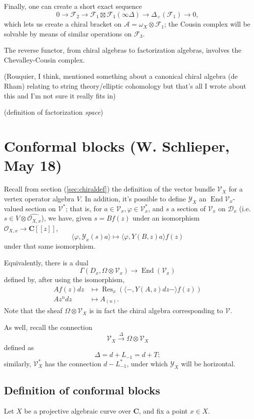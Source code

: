 \documentclass{article}
\newcommand{\CC}{\mathbold{C}}
\newcommand{\Oo}{\mathcal{O}}
\newcommand{\Dd}{\mathcal{D}}
\newcommand{\Aa}{\mathcal{A}}
\newcommand{\Ff}{\mathcal{F}}
\newcommand{\Vv}{\mathcal{V}}
\newcommand{\Yy}{\mathcal{Y}}
\DeclareMathOperator{\Res}{Res}
\DeclareMathOperator{\End}{End}
\begin{document}
Finally, one can create a short exact sequence
\[0 \rightarrow \Ff_2 \rightarrow \Ff_1 \boxtimes \Ff_1 (\infty \Delta) \rightarrow \Delta_+(\Ff_1) \rightarrow 0, \]
which lets us create a chiral bracket on $\Aa = \omega_X \otimes \Ff_1$; the Cousin complex will be solvable by means of similar operations on $\Ff_3$.

The reverse functor, from chiral algebras to factorization algebras, involves the Chevalley-Cousin complex.

(Rouquier, I think, mentioned something about a canonical chiral algebra (de Rham) relating to string theory/elliptic cohomology but that's all I wrote about this and I'm not sure it really fits in)

(definition of factorization \textit{space})

\section{Conformal blocks (W. Schlieper, May 18)}
\label{sec:confblocks}
Recall from section (\ref{sec:chiraldef}) the definition of the vector bundle $\Vv_X$ for a vertex operator algebra $V$.  In addition, it's possible to define $\Yy_X$ an $\End{\Vv_x}$-valued section on $\Vv^*$; that is, for $a \in \Vv_x, \varphi \in \Vv^*_x$, and $s$ a section of $\Vv_x$ on $\Dd_x$ (i.e. $s \in V \otimes \widehat{\Oo_{X,x}}$), we have, given $s=Bf(z)$ under an isomorphism $\Oo_{X,x}\rightarrow \CC[[z]]$,
\[\langle \varphi,\Yy_x(s)a \rangle \mapsto \langle \varphi,Y(B,z)a \rangle f(z) \]
under that same isomorphism.

Equivalently, there is a dual 
\[\Gamma(D_x,\Omega \otimes \Vv_x) \rightarrow \End(\Vv_x) \]
defined by, after using the isomorphism,
\begin{align}
  A f(z) dz &\mapsto \Res_x(\langle -,Y(A,z)dz - \rangle f(z))\\
  Az^n dz &\mapsto A_{(n)}.
\end{align}
Note that the sheaf $\Omega \otimes \Vv_X$ is in fact the chiral algebra corresponding to $\Vv$.

As well, recall the connection
\[\Vv_X \overset{\Delta}{\rightarrow} \Omega \otimes \Vv_X \]
defined as
\[\Delta = d+L_{-1}=d+T; \]
similarly, $\Vv^*_X$ has the connection $d-L^*_{-1}$, under which $\Yy_X$ will be horizontal.

\subsection{Definition of conformal blocks}
Let $X$ be a projective algebraic curve over $\CC$, and fix a point $x \in X$.
\end{document}
